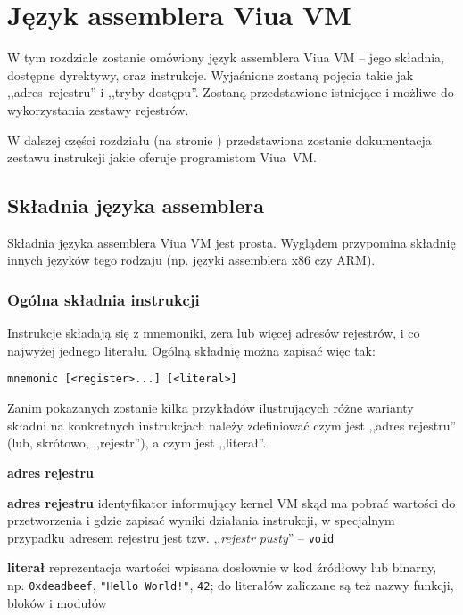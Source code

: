 \chapter{Język assemblera Viua VM}
\label{appendix_viua_vm_assembly_language}

W tym rozdziale zostanie omówiony język assemblera Viua VM -- jego składnia,
dostępne dyrektywy, oraz instrukcje. Wyjaśnione zostaną pojęcia takie jak
,,adres~rejestru'' i ,,tryby dostępu''. Zostaną przedstawione istniejące i
możliwe do wykorzystania zestawy rejestrów.

W dalszej części rozdziału (na stronie \pageref{appendix_viua_vm_assembly_language_ops})
przedstawiona zostanie dokumentacja zestawu instrukcji jakie oferuje
programistom Viua~VM.

\section{Składnia języka assemblera}
\label{appendix_viua_vm_assembly_language_syntax}

Składnia języka assemblera Viua VM jest prosta. Wyglądem przypomina składnię innych języków tego rodzaju
(np. języki assemblera x86 czy ARM).

\subsection{Ogólna składnia instrukcji}
\label{appendix_viua_vm_assembly_language_syntax_generic}

Instrukcje składają się z mnemoniki, zera lub więcej adresów rejestrów, i co najwyżej jednego literału. Ogólną składnię można zapisać więc tak:

\begin{lstlisting}
mnemonic [<register>...] [<literal>]
\end{lstlisting}

Zanim pokazanych zostanie kilka przykładów ilustrujących różne warianty składni na konkretnych instrukcjach
należy zdefiniować czym jest ,,adres rejestru'' (lub, skrótowo, ,,rejestr''), a czym jest ,,literał''.

\begin{labeling}{\textbf{adres rejestru}}
	\item[\textbf{adres rejestru}] identyfikator informujący kernel VM skąd ma pobrać wartości do
		przetworzenia i gdzie zapisać wyniki działania instrukcji, w specjalnym przypadku adresem rejestru
		jest tzw. ,,\emph{rejestr pusty}'' -- \texttt{void}
	\item[\textbf{literał}] reprezentacja wartości wpisana dosłownie w kod źródłowy lub binarny,
		np. \texttt{0xdeadbeef}, \texttt{"Hello World!"}, \texttt{42}; do literałów zaliczane są też nazwy
		funkcji, bloków i modułów
\end{labeling}


